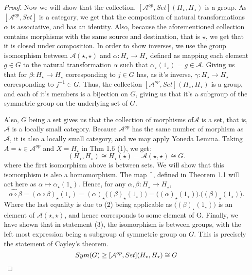 \documentclass[18pt,a4paper]{article}
\theoremstyle{definition}
\begin{document}
\begin{proof}
	Now we will show that the collection, $[\mathcal{A} ^{op},Set](H_\star, H_\star)$ is a
	group. As $[\mathcal{A} ^{op},Set]$ is a category, we get that the composition of
	natural transformations $\alpha$ is associative, and has an identity. Also,
	because the aforementioned collection contains morphisms with the same source and
	destination, that is $\star$, we get that it is closed under composition. In order
	to show inverses, we use the group isomorphism between $\mathcal{A} (\star,\star)$ and
	$\alpha:H_\star \to H_\star$ defined as mapping each element $g\in G$ to the natural
	transformation $\alpha$ such that $\alpha_\star(1_\star)=g \in \mathcal{A} $.
	Giving us that for $\beta:H_\star \to H_\star$ corresponding to $j\in G$ has, as it's
	inverse, $\gamma:H_\star \to H_\star$ corresponding to $j^{-1} \in G$. Thus, the
	collection $[ \mathcal{A} ^{op}, Set](H_\star,H_\star)$ is a group, and each of it's
	members is a bijection on $G$, giving us that it's a subgroup of the symmetric group
	on the underlying set of $G$.

	Also, $G$ being a set gives us that the collection of morphisms of$\mathcal{A}$
	is a set, that is, $\mathcal{A} $ is a locally small category. Because
	$\mathcal{A} ^{op}$ has the same number of morphism as $\mathcal{A}$,
	it is also a locally small category, and we may apply Yoneda Lemma. Taking $A=\star
	\in \mathcal{A} ^{op}$ and $X=H_\star$ in Thm 1.6 (1), we get:
	\begin{equation} [ \mathcal{A} ^{op}, Set](H_\star,H_\star) \cong H_\star(\star)
	= \mathcal{A} (\star,\star) \cong G.\end{equation}
	where the first isomorphism above is between sets. We will show that this
	isomorphism is also a homomorphism.
	The map $\string ^$, defined in Theorem 1.1 will act here as $\alpha
	\mapsto \alpha_\star (1_\star)$. Hence, for any $\alpha,\beta:H_\star
	\to H_\star$,
	\begin{equation}
		\widehat {\alpha \circ \beta}= (\alpha \circ \beta)_\star(1_\star)
		=(\alpha)_\star \Big( (\beta)_\star (1_\star) \Big)=
		\Big((\alpha)_\star(1_\star) \Big) . \Big( (\beta)_\star (1_\star) \Big).
	\end{equation}
	Where the last equality is due to (2) being applicable
	as $\Big((\beta)_\star (1_\star)\Big)$ is an element of $\mathcal{A} (\star,\star)$,
	and hence corresponds to some element of G.
	Finally, we have shown that in statement (3), the isomorphism is between groups,
	with the left most expression being a subgroup of symmetric group on $G$. This is
	precisely the statement of Cayley's theorem.
	\[ Sym(G) \geq [ \mathcal{A} ^{op}, Set](H_\star,H_\star) \cong G \qedhere \]
\end{proof}
\end{document}
